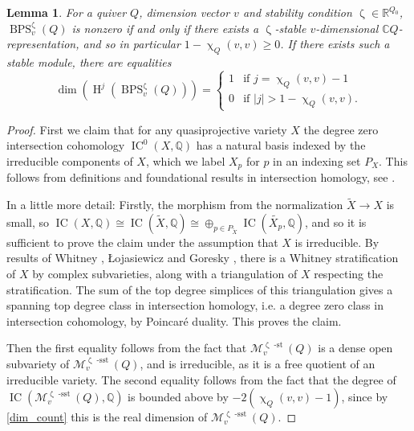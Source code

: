 \documentclass{amsart}
\DeclareMathOperator{\sst}{-sst}
\DeclareMathOperator{\IC}{IC}
\newcommand{\Msp}{\mathcal{M}}
\DeclareMathOperator{\HO}{H}
\DeclareMathOperator{\sstable}{-sst}
\DeclareMathOperator{\BPS}{BPS}
\DeclareMathOperator{\stable}{-st}
\let\bb=\mathbb
\let\wt=\widetilde
\renewcommand{\zeta}{\upzeta}
\renewcommand{\chi}{\upchi}
\theoremstyle{plain}%
\newtheorem{lem}[thm]{Lemma}
\theoremstyle{definition}
\theoremstyle{remark}
\begin{document}
\begin{lem}
\label{dimension_lemma}
For a quiver $Q$, dimension vector $v$ and stability condition $\zeta\in\bb{R}^{Q_0}$, $\BPS^{\zeta}_v(Q)$ is nonzero if and only if there exists a $\zeta$-stable $v$-dimensional $\mathbb{C}Q$-representation, and so in particular $1-\chi_Q(v,v)\geq 0$.  If there exists such a stable module, there are equalities
\[
\dim(\HO^{j}(\BPS^{\zeta}_v(Q)))=\begin{cases} 1 &\textrm{if }j=\chi_Q(v,v)-1\\
0&\textrm{if }\lvert j\lvert>1- \chi_Q(v,v).
\end{cases}
\]
\end{lem}
\begin{proof}
First we claim that for any quasiprojective variety $X$ the degree zero intersection cohomology $\IC^0(X,\bb{Q})$ has a natural basis indexed by the irreducible components of $X$, which we label $X_p$ for $p$ in an indexing set $P_X$.  This follows from definitions and foundational results in intersection homology, see \cite[Chapter 4]{KiWo}.  

In a little more detail:  Firstly, the morphism from the normalization $\wt{X}\rightarrow X$ is small, so $\IC(X,\bb{Q})\cong \IC(\wt{X},\bb{Q})\cong \oplus_{p\in P_{\tilde{X}}} \IC(\wt{X_p},\bb{Q})$, and so it is sufficient to prove the claim under the assumption that $X$ is irreducible.  By results of Whitney \cite{Whitney}, \L ojasiewicz \cite{Loj} and Goresky \cite{Gor}, there is a Whitney stratification of $X$ by complex subvarieties, along with a triangulation of $X$ respecting the stratification.  The sum of the top degree simplices of this triangulation gives a spanning top degree class in intersection homology, i.e. a degree zero class in intersection cohomology, by Poincar\'e duality.  This proves the claim.  

Then the first equality follows from the fact that $\Msp_v^{\zeta\stable}(Q)$ is a dense open subvariety of $\Msp_v^{\zeta\sstable}(Q)$, and is irreducible, as it is a free quotient of an irreducible variety.  The second equality follows from the fact that the degree of $\IC\left(\Msp_v^{\zeta\sst}(Q),\mathbb{Q}\right)$ is bounded above by $-2(\chi_Q(v,v)-1)$, since by \eqref{dim_count} this is the real dimension of $\Msp_v^{\zeta\sstable}(Q)$.
\end{proof}
\end{document}
